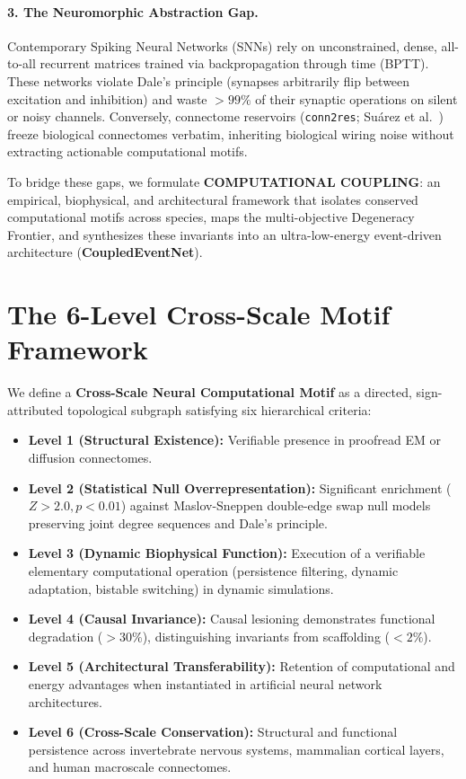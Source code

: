 \documentclass[10pt,twocolumn,letterpaper]{article}
\begin{document}
\paragraph{3. The Neuromorphic Abstraction Gap.} Contemporary Spiking Neural Networks (SNNs) rely on unconstrained, dense, all-to-all recurrent matrices trained via backpropagation through time (BPTT). These networks violate Dale's principle (synapses arbitrarily flip between excitation and inhibition) and waste $>99\%$ of their synaptic operations on silent or noisy channels. Conversely, connectome reservoirs (\texttt{conn2res}; Su{\'a}rez et al.~\cite{suarez2024connectome}) freeze biological connectomes verbatim, inheriting biological wiring noise without extracting actionable computational motifs.

To bridge these gaps, we formulate \textbf{COMPUTATIONAL COUPLING}: an empirical, biophysical, and architectural framework that isolates conserved computational motifs across species, maps the multi-objective Degeneracy Frontier, and synthesizes these invariants into an ultra-low-energy event-driven architecture (\textbf{CoupledEventNet}).

\section{The 6-Level Cross-Scale Motif Framework}

We define a \textbf{Cross-Scale Neural Computational Motif} as a directed, sign-attributed topological subgraph satisfying six hierarchical criteria:
\begin{itemize}[leftmargin=*]
    \item \textbf{Level 1 (Structural Existence):} Verifiable presence in proofread EM or diffusion connectomes.
    \item \textbf{Level 2 (Statistical Null Overrepresentation):} Significant enrichment ($Z > 2.0, p < 0.01$) against Maslov-Sneppen double-edge swap null models preserving joint degree sequences and Dale's principle.
    \item \textbf{Level 3 (Dynamic Biophysical Function):} Execution of a verifiable elementary computational operation (persistence filtering, dynamic adaptation, bistable switching) in dynamic simulations.
    \item \textbf{Level 4 (Causal Invariance):} Causal lesioning demonstrates functional degradation ($>30\%$), distinguishing invariants from scaffolding ($<2\%$).
    \item \textbf{Level 5 (Architectural Transferability):} Retention of computational and energy advantages when instantiated in artificial neural network architectures.
    \item \textbf{Level 6 (Cross-Scale Conservation):} Structural and functional persistence across invertebrate nervous systems, mammalian cortical layers, and human macroscale connectomes.
\end{itemize}
\end{document}
